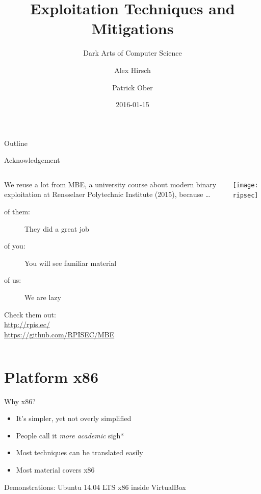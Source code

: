 \documentclass[beamer]{uibk}
\title{Exploitation Techniques and Mitigations}
\subtitle{Dark Arts of Computer Science}
\author{Alex Hirsch \and Patrick Ober}
\date{2016-01-15}
\begin{document}
\maketitle

\begin{frame}{Outline}
    \begin{multicols}{2}
        \tableofcontents
    \end{multicols}
\end{frame}

\begin{frame}{Acknowledgement}
    \begin{columns}
        \begin{column}{0.5\textwidth}
            We reuse a lot from MBE, a university course about modern binary
            exploitation at Rensselaer Polytechnic Institute (2015), because
            \dots

            \begin{description}
                \item[of them:] They did a great job
                \item[of you:] You will see familiar material
                \item[of us:] We are lazy
            \end{description}

            Check them out:\\
            \url{http://rpis.ec/}\\
            \url{https://github.com/RPISEC/MBE}
        \end{column}
        \begin{column}{0.5\textwidth}
            \texttt{[image: ripsec]}
        \end{column}
    \end{columns}
\end{frame}

\section{Platform x86}

\begin{frame}{Why x86?}
    \begin{itemize}
        \item It's simpler, yet not overly simplified
        \item People call it \emph{more academic} \quad *sigh*
        \item Most techniques can be translated easily
        \item Most material covers x86
    \end{itemize}
    \bigskip
    Demonstrations: Ubuntu 14.04 LTS x86 inside VirtualBox
\end{frame}
\end{document}
